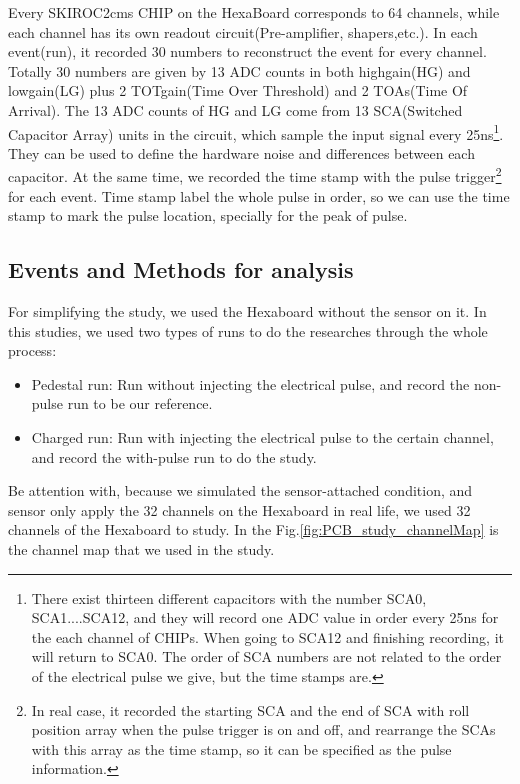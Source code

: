 \documentclass[12pt,twoside,a4paper,an,final]{cms-tdr}
\begin{document}
Every SKIROC2cms CHIP on the HexaBoard corresponds to 64 channels, while each channel has its own readout circuit(Pre-amplifier, shapers,etc.). In each event(run), it recorded 30 numbers to reconstruct the event for every channel. Totally 30 numbers are given by 13 ADC counts in both highgain(HG) and lowgain(LG) plus 2 TOTgain(Time Over Threshold) and 2 TOAs(Time Of Arrival).  The 13 ADC counts of HG and LG come from 13 SCA(Switched Capacitor Array) units in the circuit, which sample the input signal every 25ns\footnote{There exist thirteen different capacitors with the number SCA0, SCA1....SCA12, and they will record one ADC value in order every 25ns for the each channel of CHIPs. When going to SCA12 and finishing recording, it will return to SCA0. The order of SCA numbers are not related to the order of the electrical pulse we give, but the time stamps are.}. They can be used to define the hardware noise and differences between each capacitor. At the same time, we recorded the time stamp with the pulse trigger\footnote{In real case, it recorded the starting SCA and the end of SCA with roll position array when the pulse trigger is on and off, and rearrange the SCAs with this array as the time stamp, so it can be specified as the pulse information.} for each event. Time stamp label the whole pulse in order,  so we can use the time stamp to mark the pulse location, specially for the peak of pulse. 

\subsection{Events and Methods for analysis}

For simplifying the study, we used the Hexaboard without the sensor on it. In this studies, we used two types of runs to do the researches through the whole process:
\begin{itemize}
\item Pedestal run: Run without injecting the electrical pulse, and record the non-pulse run to be our reference.
\item Charged run: Run with injecting the electrical pulse to the certain channel, and record the with-pulse run to do the study. 
\end{itemize}

Be attention with, because we simulated the sensor-attached condition, and sensor only apply the 32 channels on the Hexaboard in real life, we used 32 channels of the Hexaboard to study. In the Fig.\ref{fig:PCB_study_channelMap} is the channel map that we used in the study.
\end{document}
